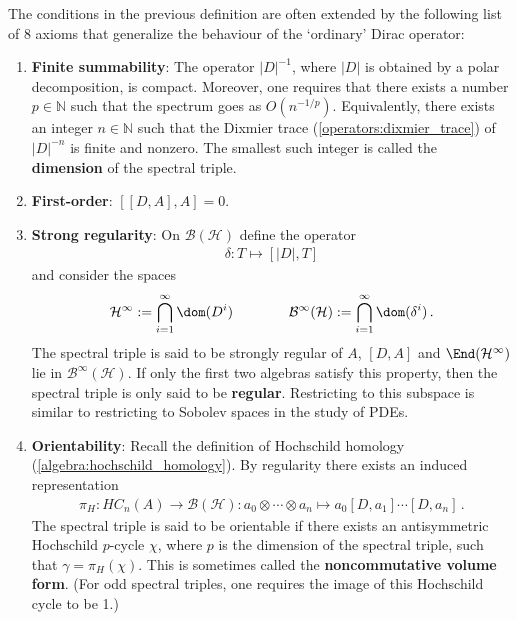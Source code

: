     \begin{remark}
        The conditions in the previous definition are often extended by the following list of 8 axioms that generalize the behaviour of the `ordinary' Dirac operator:
        \begin{enumerate}
            \item\textbf{Finite summability}: The operator $|D|^{-1}$, where $|D|$ is obtained by a polar decomposition, is compact. Moreover, one requires that there exists a number $p\in\mathbb{N}$ such that the spectrum goes as $O(n^{-1/p})$. Equivalently, there exists an integer $n\in\mathbb{N}$ such that the Dixmier trace (\cref{operators:dixmier_trace}) of $|D|^{-n}$ is finite and nonzero. The smallest such integer is called the \textbf{dimension} of the spectral triple.
            \item\textbf{First-order}: $[[D,A],A]=0$.
            \item\textbf{Strong regularity}: On $\mathcal{B}(\mathcal{H})$ define the operator
            \begin{gather}
                \delta:T\mapsto[|D|,T]
            \end{gather}
            and consider the spaces
            \begin{gather}
                \mathcal{H}^\infty:=\bigcap_{i=1}^\infty\dom(D^i)\qquad\qquad\mathcal{B}^\infty(\mathcal{H}):=\bigcap_{i=1}^\infty\dom(\delta^i)\,.
            \end{gather}
            The spectral triple is said to be strongly regular of $A$, $[D,A]$ and $\End(\mathcal{H}^\infty)$ lie in $\mathcal{B}^\infty(\mathcal{H})$. If only the first two algebras satisfy this property, then the spectral triple is only said to be \textbf{regular}. Restricting to this subspace is similar to restricting to Sobolev spaces in the study of PDEs.
            \item\textbf{Orientability}: Recall the definition of Hochschild homology (\cref{algebra:hochschild_homology}). By regularity there exists an induced representation
            \begin{gather}
                \pi_H:HC_n(A)\rightarrow\mathcal{B}(\mathcal{H}):a_0\otimes\cdots\otimes a_n\mapsto a_0[D,a_1]\cdots[D,a_n]\,.
            \end{gather}
            The spectral triple is said to be orientable if there exists an antisymmetric Hochschild $p$-cycle $\chi$, where $p$ is the dimension of the spectral triple, such that $\gamma=\pi_H(\chi)$. This is sometimes called the \textbf{noncommutative volume form}. (For odd spectral triples, one requires the image of this Hochschild cycle to be 1.)

\end{enumerate}
\end{remark}
